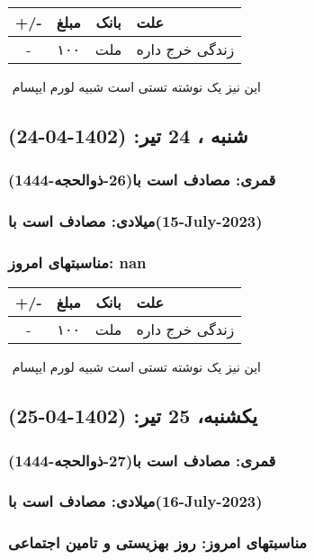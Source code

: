 \documentclass{article}
\newcommand{\rnote}[1]{\marginpar{\textcolor{color}{\StrSubstitute{\##1}{ }{\_}}}}
\newcommand{\myRow}[4]{
    #1 & #2 & #3 & #4 \\ \hline
}
\begin{document}
\begin{tabular}{ | c | c | c | p{5cm} |}
    \hline
    \myRow{ +/- }{مبلغ}{بانک}{علت}
    \myRow{-}{۱۰۰}{ملت}{زندگی خرج داره}
\end{tabular}
\newline
\newline

‌
\rnote{تست}
این نیز یک نوشته تستی است شبیه لورم ایپسام




\newpage
{}
\textcolor{color}{
\section{ شنبه ، 24 تیر: (1402-04-24) }
\subsubsection*{قمری: مصادف است با(26-ذوالحجه-1444)} 
\subsubsection*{میلادی: مصادف است با(15-July-2023)}
\subsubsection*{مناسبتهای امروز: nan}
}


\begin{tabular}{ | c | c | c | p{5cm} |}
    \hline
    \myRow{ +/- }{مبلغ}{بانک}{علت}
    \myRow{-}{۱۰۰}{ملت}{زندگی خرج داره}
\end{tabular}
\newline
\newline

‌
\rnote{تست}
این نیز یک نوشته تستی است شبیه لورم ایپسام




\newpage
{}
\textcolor{color}{
\section{ یکشنبه، 25 تیر: (1402-04-25) }
\subsubsection*{قمری: مصادف است با(27-ذوالحجه-1444)} 
\subsubsection*{میلادی: مصادف است با(16-July-2023)}
\subsubsection*{مناسبتهای امروز: روز بهزیستی و تامین اجتماعی}
}
\end{document}
